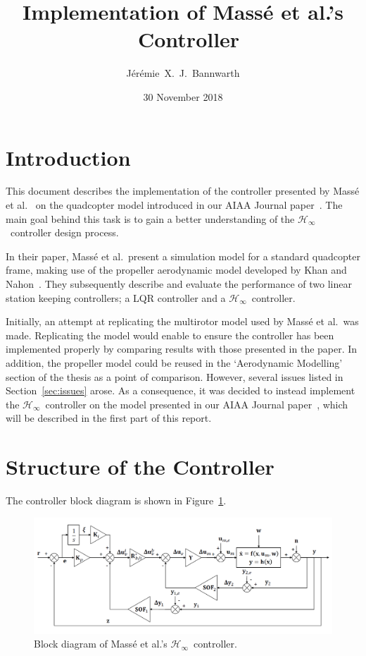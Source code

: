 \documentclass[a4paper,12pt]{article}
\title{Implementation of Mass{\'e} et al.'s \Hinf\ Controller}
\author{J{\'e}r{\'e}mie~X.~J.~Bannwarth}
\date{30 November 2018}
\newcommand{\hinf}{\mathcal{H}_\infty}
\newcommand{\Hinf}{\(\hinf\)}
\begin{document}
    \maketitle

    \section{Introduction}

        This document describes the implementation of the controller presented by Mass{\'e} et al.~\cite{MasseEtAl2018} on the quadcopter model introduced in our AIAA Journal paper~\cite{BannwarthEtAl2018}. The main goal behind this task is to gain a better understanding of the \Hinf\ controller design process.
        
        In their paper, Mass{\'e} et al.\ present a simulation model for a standard quadcopter frame, making use of the propeller aerodynamic model developed by Khan and Nahon~\cite{KhanNahon2013,KhanNahon2015}. They subsequently describe and evaluate the performance of two linear station keeping controllers; a LQR controller and a \Hinf\ controller.

        Initially, an attempt at replicating the multirotor model used by Mass{\'e} et al.\ was made. Replicating the model would enable to ensure the controller has been implemented properly by comparing results with those presented in the paper. In addition, the propeller model could be reused in the `Aerodynamic Modelling' section of the thesis as a point of comparison. However, several issues listed in Section~\ref{sec:issues} arose. As a consequence, it was decided to instead implement the \Hinf\ controller on the model presented in our AIAA Journal paper~\cite{BannwarthEtAl2018}, which will be described in the first part of this report.

    \section{Structure of the Controller}

        The controller block diagram is shown in Figure~\ref{fig:ctrl_block_diag}.
        
        \begin{figure}[h!]
            \centering%
            \includegraphics[width=16cm]{ctrl_block_diag.png}%
            \caption{Block diagram of Mass{\'e} et al.'s \Hinf\ controller.}\label{fig:ctrl_block_diag}
        \end{figure}
\end{document}
